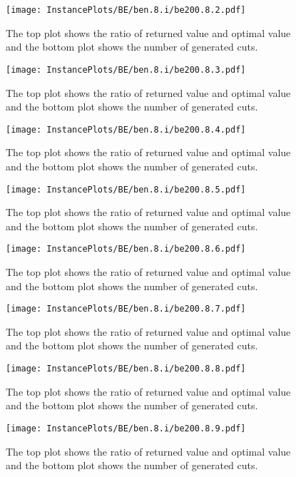 \documentclass[10pt,a4paper]{article}
\begin{document}
\begin{figure}[H]
\texttt{[image: InstancePlots/BE/ben.8.i/be200.8.2.pdf]}
\caption{The top plot shows the ratio of returned value and optimal value     and the bottom plot shows the number of generated cuts.}
\end{figure}

\begin{figure}[H]
\texttt{[image: InstancePlots/BE/ben.8.i/be200.8.3.pdf]}
\caption{The top plot shows the ratio of returned value and optimal value     and the bottom plot shows the number of generated cuts.}
\end{figure}

\begin{figure}[H]
\texttt{[image: InstancePlots/BE/ben.8.i/be200.8.4.pdf]}
\caption{The top plot shows the ratio of returned value and optimal value     and the bottom plot shows the number of generated cuts.}
\end{figure}

\begin{figure}[H]
\texttt{[image: InstancePlots/BE/ben.8.i/be200.8.5.pdf]}
\caption{The top plot shows the ratio of returned value and optimal value     and the bottom plot shows the number of generated cuts.}
\end{figure}

\begin{figure}[H]
\texttt{[image: InstancePlots/BE/ben.8.i/be200.8.6.pdf]}
\caption{The top plot shows the ratio of returned value and optimal value     and the bottom plot shows the number of generated cuts.}
\end{figure}

\begin{figure}[H]
\texttt{[image: InstancePlots/BE/ben.8.i/be200.8.7.pdf]}
\caption{The top plot shows the ratio of returned value and optimal value     and the bottom plot shows the number of generated cuts.}
\end{figure}

\begin{figure}[H]
\texttt{[image: InstancePlots/BE/ben.8.i/be200.8.8.pdf]}
\caption{The top plot shows the ratio of returned value and optimal value     and the bottom plot shows the number of generated cuts.}
\end{figure}

\begin{figure}[H]
\texttt{[image: InstancePlots/BE/ben.8.i/be200.8.9.pdf]}
\caption{The top plot shows the ratio of returned value and optimal value     and the bottom plot shows the number of generated cuts.}
\end{figure}
\end{document}
